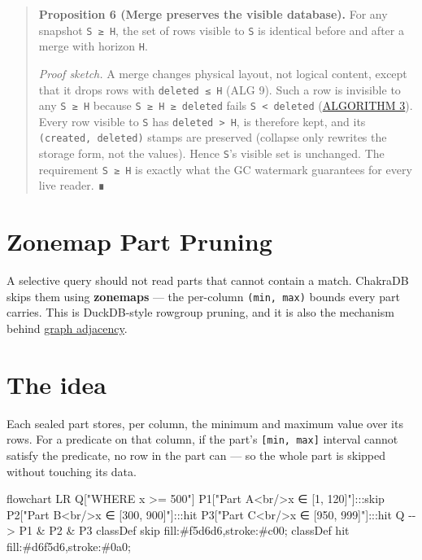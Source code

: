 \documentclass[
  11pt,
  openany]{book}
\newenvironment{Shaded}{}{}
\newcommand{\NormalTok}[1]{#1}
\begin{document}
\begin{quote}
\textbf{Proposition 6 (Merge preserves the visible database).} For any
snapshot \texttt{S\ ≥\ H}, the set of rows visible to \texttt{S} is
identical before and after a merge with horizon \texttt{H}.

\emph{Proof sketch.} A merge changes physical layout, not logical
content, except that it drops rows with \texttt{deleted\ ≤\ H} (ALG 9).
Such a row is invisible to any \texttt{S\ ≥\ H} because
\texttt{S\ ≥\ H\ ≥\ deleted} fails \texttt{S\ \textless{}\ deleted}
(\href{mvcc.md}{ALGORITHM 3}). Every row visible to \texttt{S} has
\texttt{deleted\ \textgreater{}\ H}, is therefore kept, and its
\texttt{(created,\ deleted)} stamps are preserved (collapse only
rewrites the storage form, not the values). Hence \texttt{S}'s visible
set is unchanged. The requirement \texttt{S\ ≥\ H} is exactly what the
GC watermark guarantees for every live reader. ∎
\end{quote}

\section{Zonemap Part Pruning}\label{zonemap-part-pruning}

A selective query should not read parts that cannot contain a match.
ChakraDB skips them using \textbf{zonemaps} --- the per-column
\texttt{(min,\ max)} bounds every part carries. This is DuckDB-style
rowgroup pruning, and it is also the mechanism behind
\href{../graph/model.md}{graph adjacency}.

\section{The idea}\label{the-idea-1}

Each sealed part stores, per column, the minimum and maximum value over
its rows. For a predicate on that column, if the part's
\texttt{{[}min,\ max{]}} interval cannot satisfy the predicate, no row
in the part can --- so the whole part is skipped without touching its
data.

\begin{Shaded}
\begin{Highlighting}[]
\NormalTok{flowchart LR}
\NormalTok{    Q["WHERE x \textgreater{}= 500"]}
\NormalTok{    P1["Part A\textless{}br/\textgreater{}x ∈ [1, 120]"]:::skip}
\NormalTok{    P2["Part B\textless{}br/\textgreater{}x ∈ [300, 900]"]:::hit}
\NormalTok{    P3["Part C\textless{}br/\textgreater{}x ∈ [950, 999]"]:::hit}
\NormalTok{    Q {-}{-}\textgreater{} P1 \& P2 \& P3}
\NormalTok{    classDef skip fill:\#f5d6d6,stroke:\#c00; classDef hit fill:\#d6f5d6,stroke:\#0a0;}
\end{Highlighting}
\end{Shaded}
\end{document}
